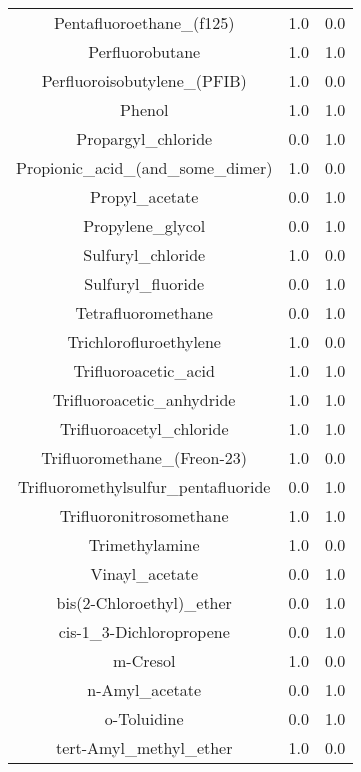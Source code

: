 \begin{tabular}{ccc}
Pentafluoroethane_(f125) &1.0 &0.0\\
Perfluorobutane &1.0 &1.0\\
Perfluoroisobutylene_(PFIB) &1.0 &0.0\\
Phenol &1.0 &1.0\\
Propargyl_chloride &0.0 &1.0\\
Propionic_acid_(and_some_dimer) &1.0 &0.0\\
Propyl_acetate &0.0 &1.0\\
Propylene_glycol &0.0 &1.0\\
Sulfuryl_chloride &1.0 &0.0\\
Sulfuryl_fluoride &0.0 &1.0\\
Tetrafluoromethane &0.0 &1.0\\
Trichlorofluroethylene &1.0 &0.0\\
Trifluoroacetic_acid &1.0 &1.0\\
Trifluoroacetic_anhydride &1.0 &1.0\\
Trifluoroacetyl_chloride &1.0 &1.0\\
Trifluoromethane_(Freon-23) &1.0 &0.0\\
Trifluoromethylsulfur_pentafluoride &0.0 &1.0\\
Trifluoronitrosomethane &1.0 &1.0\\
Trimethylamine &1.0 &0.0\\
Vinayl_acetate &0.0 &1.0\\
bis(2-Chloroethyl)_ether &0.0 &1.0\\
cis-1_3-Dichloropropene &0.0 &1.0\\
m-Cresol &1.0 &0.0\\
n-Amyl_acetate &0.0 &1.0\\
o-Toluidine &0.0 &1.0\\
tert-Amyl_methyl_ether &1.0 &0.0\\
\hline
\end{tabular}
